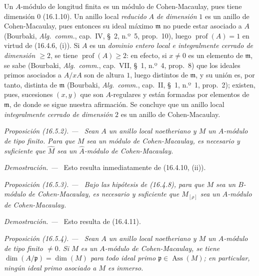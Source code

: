 \documentclass[10pt,oneside]{book}
\makeatletter
\newcommand{\setmanualcurrentlabel}[1]{\def\@currentlabel{#1}}
\newenvironment{proposition}[1][]{%
  \setmanualcurrentlabel{#1}\par\medskip\noindent\itshape Proposición (#1). ---\ }{\par}
\newenvironment{proof}{%
  \par\medskip\noindent\textit{Demostración. ---\ }}{\par}
\makeatother
\begin{document}
Un $A$-módulo de longitud finita es un módulo de Cohen-Macaulay, pues tiene
dimensión $0$ (16.1.10). Un anillo local \emph{reducido} $A$ \emph{de dimensión} $1$ es un
anillo de Cohen-Macaulay, pues entonces su ideal máximo $\mathfrak{m}$ no puede
estar asociado a $A$ (Bourbaki, \emph{Alg.~comm.}, cap.~IV, \S~2, n.º~5,
prop.~10), luego $\operatorname{prof}(A)=1$ en virtud de (16.4.6, (i)). Si $A$
es un \emph{dominio entero local e integralmente cerrado de dimensión
$\geq2$}, se tiene $\operatorname{prof}(A)\geq2$: en efecto, si $x\neq0$ es un
elemento de $\mathfrak{m}$, se sabe (Bourbaki, \emph{Alg.~comm.}, cap.~VII,
\S~1, n.º~4, prop.~8) que los ideales primos asociados a $A/xA$ son de altura
$1$, luego distintos de $\mathfrak{m}$, y su unión es, por tanto, distinta de
$\mathfrak{m}$ (Bourbaki, \emph{Alg.~comm.}, cap.~II, \S~1, n.º~1,
prop.~2); existen, pues, sucesiones $(x,y)$ que son $A$-regulares y están
formadas por elementos de $\mathfrak{m}$, de donde se sigue nuestra afirmación.
Se concluye que un anillo local \emph{integralmente cerrado de dimensión} $2$ es un
anillo de Cohen-Macaulay.

\begin{proposition}[16.5.2]
\label{0.16.5.2-es}
Sean $A$ un anillo local noetheriano y $M$ un $A$-módulo de tipo finito. Para
que $M$ sea un módulo de Cohen-Macaulay, es necesario y suficiente que
$\widehat M$ sea un $\widehat A$-módulo de Cohen-Macaulay.
\end{proposition}
\begin{proof}
Esto resulta inmediatamente de (16.4.10, (ii)).
\end{proof}

\begin{proposition}[16.5.3]
\label{0.16.5.3-es}
Bajo las hipótesis de \textup{(16.4.8)}, para que $M$ sea un $B$-módulo de
Cohen-Macaulay, es necesario y suficiente que $M_{[\rho]}$ sea un $A$-módulo de
Cohen-Macaulay.
\end{proposition}

\begin{proof}
Esto resulta de (16.4.11).
\end{proof}

\begin{proposition}[16.5.4]
\label{0.16.5.4-es}
Sean $A$ un anillo local noetheriano y $M$ un $A$-módulo de tipo finito $\neq0$.
Si $M$ es un $A$-módulo de Cohen-Macaulay, se tiene
$\dim(A/\mathfrak{p})=\dim(M)$ para todo ideal primo
$\mathfrak{p}\in\operatorname{Ass}(M)$; en particular, ningún ideal primo
asociado a $M$ es inmerso.
\end{proposition}
\end{document}
